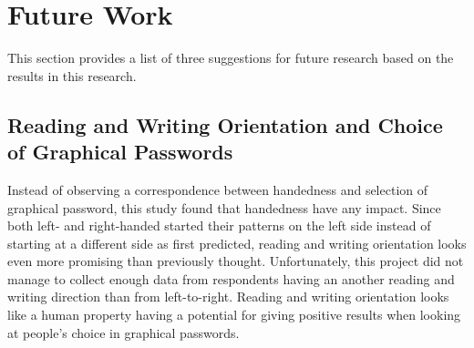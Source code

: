 


  \clearpage
  \section{Future Work}\label{sec:futureWork}

    This section provides a list of three suggestions for future research based on the results in this research.

    \subsection{Reading and Writing Orientation and Choice of Graphical Passwords}
      Instead of observing a correspondence between handedness and selection of graphical password, this study found that handedness have any impact. Since both left- and right-handed started their patterns on the left side instead of starting at a different side as first predicted, reading and writing orientation looks even more promising than previously thought. Unfortunately, this project did not manage to collect enough data from respondents having an another reading and writing direction than from left-to-right. Reading and writing orientation looks like a human property having a potential for giving positive results when looking at people's choice in graphical passwords. 


